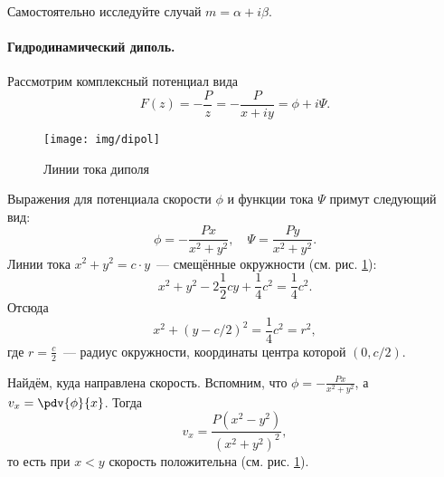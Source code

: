 Самостоятельно исследуйте случай $m=\alpha+i\beta$.
%
%
%

\paragraph{Гидродинамический диполь.} Рассмотрим комплексный потенциал вида
\begin{equation}
	F(z)=-\frac{P}{z}=-\frac{P}{x+iy}=\phi+i\Psi.
\end{equation}

\begin{figure}[ht!]
    \centering
    \texttt{[image: img/dipol]}
    \caption{Линии тока диполя}
    \label{fig:dipolline}
\end{figure}
\begin{comment}
	картинка диполя:
     __>___
 \	/ _>__ \ /
  \	|/    \|/
----*      *-------
  / |\_>__/|\
 /	\__>___/ \
\end{comment}

Выражения для потенциала скорости $\phi$ и функции тока $\Psi$ примут следующий вид:
\begin{equation}
	\phi=-\frac{Px}{x^2+y^2}, \quad
	\Psi=\frac{Py}{x^2+y^2}.
\end{equation}
Линии тока $x^2+y^2=c\cdot y$~--- смещённые окружности (см. рис. \ref{fig:dipolline}):
\begin{equation}
	x^2+y^2-2\frac{1}{2}cy+\frac{1}{4}c^2=\frac{1}{4}c^2.
\end{equation}
Отсюда
\begin{equation}
	x^2+(y-c/2)^2=\frac{1}{4}c^2=r^2,
\end{equation}
где $r=\frac{c}{2}$~--- радиус окружности, координаты центра которой $(0,c/2)$.

Найдём, куда направлена скорость. Вспомним, что $\phi=-\frac{Px}{x^2+y^2}$, а $v_x=\pdv{\phi}{x}$. Тогда
\begin{equation}
	v_x=\frac{P(x^2-y^2)}{(x^2+y^2)^2},
\end{equation}
то есть при $x<y$ скорость положительна (см. рис. \ref{fig:dipolline}).

